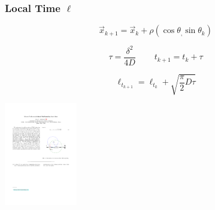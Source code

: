 \documentclass[9pt]{beamer}
\newcommand{\tens}{\ \ \ \ \ \ \ \ \ \ }
\newcommand{\tbf}{\textbf}
\newcommand{\dlt}{\delta}
\newcommand{\tta}{\theta}
\begin{document}
\begin{frame}[noframenumbering]
	\frametitle{\tbf{Local Time} $\ell$}
	
  \begin{minipage}{0.5\linewidth}
  $$ \vec{x}_{k+1} = \vec{x}_k + \rho(\cos\tta_, \sin\tta_k) $$
  
  $$ \tau = \frac{\dlt^2}{4D} \tens t_{k+1} = t_k + \tau $$
  
  $$ \ell_{t_{k+1}} = \ell_{t_k} + \sqrt{\frac{\pi}{2} D \tau} $$
  
  \end{minipage}
  \begin{minipage}{0.4\linewidth}
  	\includegraphics[height=4.5cm]{figs/simu_reflect.pdf}
  \end{minipage}
	
\end{frame}
\end{document}
